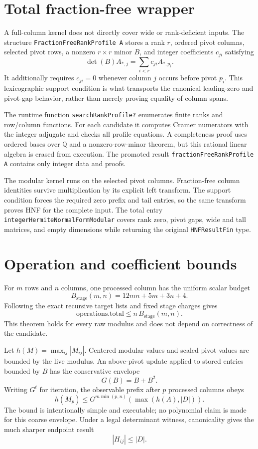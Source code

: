 \documentclass[11pt]{article}
\newcommand{\code}[1]{\texttt{#1}}
\newcommand{\Q}{\mathbb{Q}}
\begin{document}
\section{Total fraction-free wrapper}

A full-column kernel does not directly cover wide or rank-deficient inputs.
The structure \code{FractionFreeRankProfile A} stores a rank $r$, ordered
pivot columns, selected pivot rows, a nonzero $r\times r$ minor $B$, and
integer coefficients $c_{ji}$ satisfying
\[
  \det(B) A_{*,j}
    =\sum_{i<r} c_{ji} A_{*,p_i}.
\]
It additionally requires $c_{ji}=0$ whenever column $j$ occurs before pivot
$p_i$.  This lexicographic support condition is what transports the canonical
leading-zero and pivot-gap behavior, rather than merely proving equality of
column spans.

The runtime function \code{searchRankProfile?} enumerates finite ranks and
row/column functions.  For each candidate it computes Cramer numerators with
the integer adjugate and checks all profile equations.  A completeness proof
uses ordered bases over $\Q$ and a nonzero-row-minor theorem, but this rational
linear algebra is erased from execution.  The promoted result
\code{fractionFreeRankProfile A} contains only integer data and proofs.

The modular kernel runs on the selected pivot columns.  Fraction-free column
identities survive multiplication by its explicit left transform.  The
support condition forces the required zero prefix and tail entries, so the
same transform proves HNF for the complete input.  The total entry
\code{integerHermiteNormalFormModular} covers rank zero, pivot gaps, wide and
tall matrices, and empty dimensions while returning the original
\code{HNFResultFin} type.

\section{Operation and coefficient bounds}

For $m$ rows and $n$ columns, one processed column has the uniform scalar
budget
\[
  B_{\mathrm{stage}}(m,n)
   =12mn+5m+3n+4.
\]
Following the exact recursive target lists and fixed stage charges gives
\[
  \text{operations.total}
    \le n\,B_{\mathrm{stage}}(m,n).
\]
This theorem holds for every raw modulus and does not depend on correctness of
the candidate.

Let $h(M)=\max_{ij}|M_{ij}|$.  Centered modular values and scaled pivot values
are bounded by the live modulus.  An above-pivot update applied to stored
entries bounded by $B$ has the conservative envelope
\[
  G(B)=B+B^2.
\]
Writing $G^t$ for iteration, the observable prefix after $p$ processed columns
obeys
\[
 h(M_p)\le
 G^{m\min(p,n)}\!\left(\max(h(A),|D|)\right).
\]
The bound is intentionally simple and executable; no polynomial claim is made
for this coarse envelope.  Under a legal determinant witness, canonicality
gives the much sharper endpoint result
\[
  |H_{ij}|\le |D|.
\]
\end{document}
